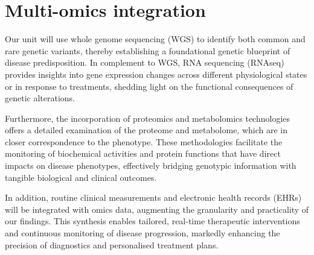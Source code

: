 \section{Multi-omics integration}

Our unit will use whole genome sequencing (WGS) to identify both common and rare genetic variants, thereby establishing a foundational genetic blueprint of disease predisposition. In complement to WGS, RNA sequencing (RNAseq) provides insights into gene expression changes across different physiological states or in response to treatments, shedding light on the functional consequences of genetic alterations.

Furthermore, the incorporation of proteomics and metabolomics technologies offers a detailed examination of the proteome and metabolome, which are in closer correspondence to the phenotype. These methodologies facilitate the monitoring of biochemical activities and protein functions that have direct impacts on disease phenotypes, effectively bridging genotypic information with tangible biological and clinical outcomes.

In addition, routine clinical measurements and electronic health records (EHRs) will be integrated with omics data, augmenting the granularity and practicality of our findings. This synthesis enables tailored, real-time therapeutic interventions and continuous monitoring of disease progression, markedly enhancing the precision of diagnostics and personalised treatment plans.
